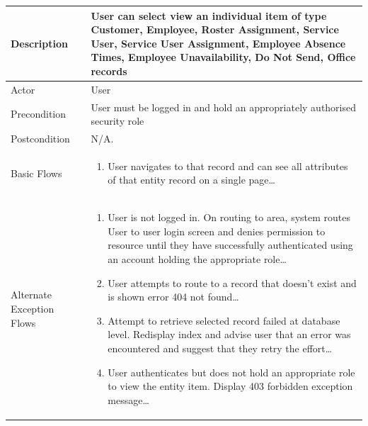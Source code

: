 \documentclass[a4paper,Times New Roman 11pt]{article}
\newcommand\addrow[2]{#1 &#2\\ }
\newcommand\addheading[2]{#1 &#2\\ \hline}
\newcommand\tabularhead{\begin{tabular}{lp{9cm}}
\hline
}
\newcommand\addmulrow[2]{ \begin{minipage}[t][][t]{3cm}#1\end{minipage}%
   &\begin{minipage}[t][][t]{9cm}
    \begin{enumerate} #2   \end{enumerate}
    \end{minipage}\\ }
\newenvironment{usecase}{\tabularhead}
{\hline\end{tabular}}
\begin{document}
\begin{samepage}
\begin{usecase}
  \addheading{Description}{User can select view an individual item of type Customer, Employee, Roster Assignment, Service User, Service User Assignment, Employee Absence Times, Employee Unavailability, Do Not Send, Office records}
  \addheading{Actor}{User} 
  \addrow{Precondition}{User must be logged in and hold an appropriately authorised security role}
  \addrow{Postcondition}{N/A.}
  \addmulrow{Basic Flows }{\item User navigates to that record and can see all attributes of that entity record on a single page\ldots}
  \addmulrow{Alternate Exception Flows}{\item User is not logged in. On routing to area, system routes User to user login screen and denies permission to resource until they have successfully authenticated using an account holding the appropriate role\ldots
                                   \item User attempts to route to a record that doesn't exist and is shown error 404 not found\ldots
                                   \item Attempt to retrieve selected record failed at database level. Redisplay index and advise user that an error was encountered and suggest that they retry the effort\ldots
                                    \item User authenticates but does not hold an appropriate role to view the entity item. Display 403 forbidden exception message\ldots}

\end{usecase}


\end{samepage}
\end{document}
